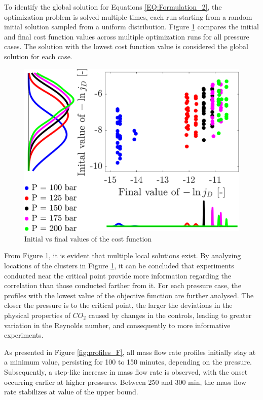 \documentclass[../Article_Sensitivity_Analsysis.tex]{subfiles}
\begin{document}
	
	To identify the global solution for Equations \ref{EQ:Formulation_2}, the optimization problem is solved multiple times, each run starting from a random initial solution sampled from a uniform distribution. Figure \ref{fig:scatter} compares the initial and final cost function values across multiple optimization runs for all pressure cases. The solution with the lowest cost function value is considered the global solution for each case.
	
	\begin{figure}[h!]
		\centering
		\includegraphics[width=\columnwidth]{Figures/Results/scatter.png}	
		\caption{Initial vs final values of the cost function}
		\label{fig:scatter}
	\end{figure}
	
	From Figure \ref{fig:scatter}, it is evident that multiple local solutions exist. By analyzing locations of the clusters in Figure \ref{fig:scatter}, it can be concluded that experiments conducted near the critical point provide more information regarding the correlation than those conducted farther from it. For each pressure case, the profiles with the lowest value of the objective function are further analysed. The closer the pressure is to the critical point, the larger the deviations in the physical properties of $CO_2$ caused by changes in the controls, leading to greater variation in the Reynolds number, and consequently to more informative experiments.
	
	As presented in Figure \ref{fig:profiles_F}, all mass flow rate profiles initially stay at a minimum value, persisting for 100 to 150 minutes, depending on the pressure. Subsequently, a step-like increase in mass flow rate is observed, with the onset occurring earlier at higher pressures. Between 250 and 300 min, the mass flow rate stabilizes at value of the upper bound.
	
\end{document}

